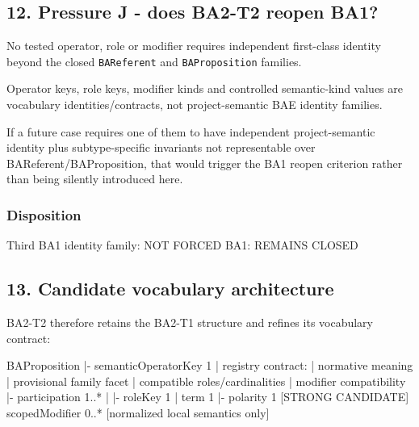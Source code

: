 \documentclass[
  10pt,
  letterpaper,
]{article}
\newenvironment{Shaded}{}{}
\newcommand{\NormalTok}[1]{#1}
\begin{document}
\subsection{12. Pressure J - does BA2-T2 reopen
BA1?}\label{pressure-j---does-ba2-t2-reopen-ba1}

No tested operator, role or modifier requires independent first-class
identity beyond the closed \texttt{BAReferent} and
\texttt{BAProposition} families.

Operator keys, role keys, modifier kinds and controlled semantic-kind
values are vocabulary identities/contracts, not project-semantic BAE
identity families.

If a future case requires one of them to have independent
project-semantic identity plus subtype-specific invariants not
representable over BAReferent/BAProposition, that would trigger the BA1
reopen criterion rather than being silently introduced here.

\subsubsection{Disposition}\label{disposition-8}

\begin{Shaded}
\begin{Highlighting}[]
\NormalTok{Third BA1 identity family: NOT FORCED}
\NormalTok{BA1: REMAINS CLOSED}
\end{Highlighting}
\end{Shaded}

\subsection{13. Candidate vocabulary
architecture}\label{candidate-vocabulary-architecture}

BA2-T2 therefore retains the BA2-T1 structure and refines its vocabulary
contract:

\begin{Shaded}
\begin{Highlighting}[]
\NormalTok{BAProposition}
\NormalTok{|{-} semanticOperatorKey   1}
\NormalTok{|    \textasciigrave{}{-} registry contract:}
\NormalTok{|         normative meaning}
\NormalTok{|         provisional family facet}
\NormalTok{|         compatible roles/cardinalities}
\NormalTok{|         modifier compatibility}
\NormalTok{|{-} participation         1..*}
\NormalTok{|    |{-} roleKey          1}
\NormalTok{|    \textasciigrave{}{-} term             1}
\NormalTok{|{-} polarity              1       [STRONG CANDIDATE]}
\NormalTok{\textasciigrave{}{-} scopedModifier        0..*    [normalized local semantics only]}
\end{Highlighting}
\end{Shaded}
\end{document}

